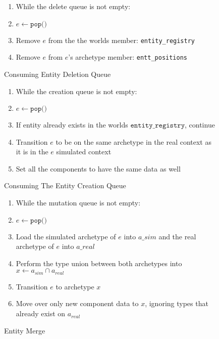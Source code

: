 \begin{figure}[htbp]
    \begin{enumerate}
        \item While the delete queue is not empty:
        \item $e \leftarrow \texttt{pop()}$
        \item Remove $e$ from the the worlds member: \texttt{entity\_registry} 
        \item Remove $e$ from $e$'s archetype member: \texttt{entt\_positions} 
\end{enumerate}
\label{alg:entt_del_queue}
\caption{Consuming Entity Deletion Queue}
\end{figure}

\begin{figure}[htbp]
    \begin{enumerate}
        \item While the creation queue is not empty:
        \item $e \leftarrow \texttt{pop()}$
        \item If entity already exists in the worlds $\texttt{entity\_registry}$, continue
        \item Transition $e$ to be on the same archetype in the real context as it is in the $e$ simulated context
        \item Set all the components to have the same data as well
\end{enumerate}
\caption{Consuming The Entity Creation Queue}
\label{alg:entt_cre_queue}
\end{figure}

\begin{figure}[htbp]
\begin{enumerate}
    \item While the mutation queue is not empty:
    \item $e \leftarrow \texttt{pop()}$
    \item Load the simulated archetype of $e$ into $a\_{sim}$ and the real archetype of $e$ into $a\_{real}$
    \item Perform the type union between both archetypes into $x \leftarrow a_{sim} \cap a_{real}$
    \item Transition $e$ to archetype $x$
    \item Move over only new component data to $x$, ignoring types that already exist on $a_{real}$
\end{enumerate}
\caption{Entity Merge}
\label{alg:entt_merge}
\end{figure}

